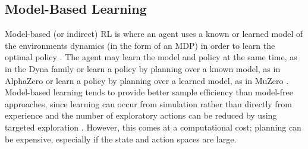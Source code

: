 \subsection{Model-Based Learning}
Model-based (or indirect) RL is where an agent uses a known or learned model of the environments dynamics (in the form of an MDP) in order to learn the optimal policy \cite{MAL-086}. The agent may learn the model and policy at the same time, as in the Dyna family \cite{Sutton:1990, 10.1145/122344.122377} or learn a policy by planning over a known model, as in AlphaZero \cite{DBLP:journals/corr/abs-1712-01815} or learn a policy by planning over a learned model, as in MuZero \cite{DBLP:journals/corr/abs-1911-08265}.
Model-based learning tends to provide better sample efficiency than model-free approaches, since learning can occur from simulation rather than directly from experience \cite{RLSOTA11} and the number of exploratory actions can be reduced by using targeted exploration \cite{Thrun-1992-15850}. However, this comes at a computational cost; planning can be expensive, especially if the state and action spaces are large.
